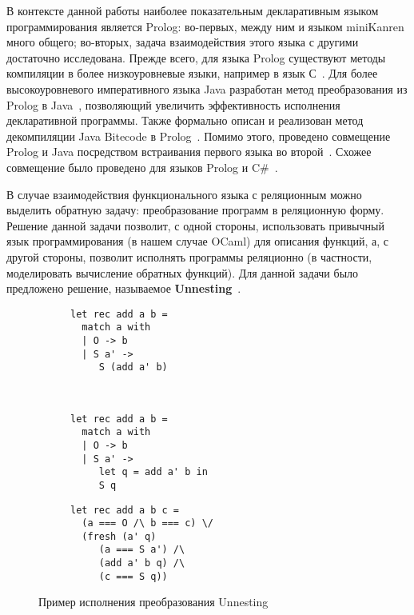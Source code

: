 В контексте данной работы наиболее показательным декларативным языком программирования является Prolog: во-первых, между ним и языком miniKanren много общего; во-вторых, задача взаимодействия этого языка с другими достаточно исследована. Прежде всего, для языка Prolog существуют методы компиляции в более низкоуровневые языки, например в язык С~\cite{RW:C1,RW:C2}. Для более высокоуровневого императивного языка Java разработан метод преобразования из Prolog в Java~\cite{RW:Prolog2Java}, позволяющий увеличить эффективность исполнения декларативной программы. Также формально описан и реализован метод декомпиляции Java Bitecode в Prolog~\cite{RW:Java2Prolog}. Помимо этого, проведено совмещение Prolog и Java посредством встраивания первого языка во второй~\cite{RW:PrologAndJava}. Схожее совмещение было проведено для языков Prolog и C\#~\cite{RW:PrologAndCSharp}. 

В случае взаимодействия функционального языка с реляционным можно выделить обратную задачу: преобразование программ в реляционную форму. Решение данной задачи позволит, с одной стороны, использовать привычный язык программирования (в нашем случае OCaml) для описания функций, а, с другой стороны, позволит исполнять программы реляционно (в частности, моделировать вычисление обратных функций). Для данной задачи было предложено решение, называемое \textbf{Unnesting}~\cite{lozov-spbu:miniKanren}.

\begin{figure}[h]
  \centering
  \begin{subfigure}[t]{0.4\textwidth}
    \centering
\begin{lstlisting}
let rec add a b =
  match a with
  | O -> b
  | S a' ->
     S (add a' b)     
\end{lstlisting}
\caption{}
  \end{subfigure}
  ~
  \begin{subfigure}[t]{0.4\textwidth}
        \centering
\begin{lstlisting}
let rec add a b =
  match a with 
  | O -> b
  | S a' -> 
     let q = add a' b in
     S q
\end{lstlisting}
\vspace{-1\baselineskip}
\caption{}
  \end{subfigure}
  \vskip2mm
  \begin{subfigure}[t]{0.4\textwidth}
        \centering
\begin{lstlisting}
let rec add a b c =
  (a === O /\ b === c) \/
  (fresh (a' q)
     (a === S a') /\
     (add a' b q) /\
     (c === S q))
\end{lstlisting}
\caption{}
  \end{subfigure}
\caption{Пример исполнения преобразования Unnesting}
\label{unnesting_example}
\end{figure}

